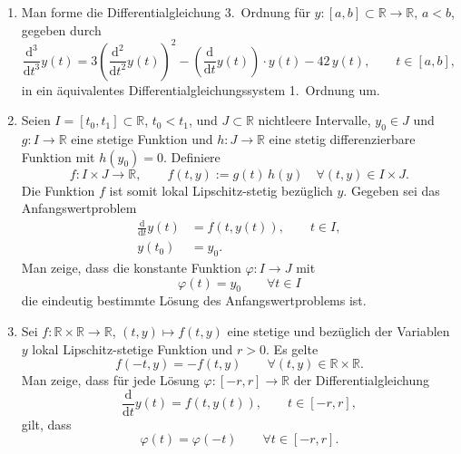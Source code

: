 \begin{enumerate}%
\item Man forme die Differentialgleichung 3.\ Ordnung für \(y:[a,b]\subset\mathbb{R}\to\mathbb{R}\), \(a<b\), gegeben durch
\[
\frac{\mathrm{d}^3}{\mathrm{d}t^3}y(t)=3\left(\frac{\mathrm{d}^2}{\mathrm{d}t^2}y(t)\right)^2-\left(\frac{\mathrm{d}}{\mathrm{d}t}y(t)\right)\cdot y(t)-42\,y(t),\qquad t\in[a,b],
\]
in ein äquivalentes Differentialgleichungssystem 1.\ Ordnung um.
\hfill {}
\vspace{1em}

\item Seien \(I=[t_0,t_1]\subset\mathbb{R}\), \(t_0<t_1\), und \(J\subset\mathbb{R}\) nichtleere Intervalle, \(y_0\in J\) und \(g:I\to\mathbb{R}\) eine stetige Funktion und \(h:J\to\mathbb{R}\) eine stetig differenzierbare Funktion mit \(h(y_0)=0\). Definiere
\[
f:I\times J\to\mathbb{R},\qquad f(t,y):=g(t)\,h(y)\quad\forall (t,y)\in I\times J.
\]
Die Funktion \(f\) ist somit lokal Lipschitz-stetig bezüglich \(y\). Gegeben sei das Anfangswertproblem
\begin{align*}
\frac{\mathrm{d}}{\mathrm{d}t}y(t)&=f(t,y(t)),\qquad t\in I,\\
y(t_0)&=y_0.
\end{align*}
Man zeige, dass die konstante Funktion \(\varphi:I\to J\) mit
\[
\varphi(t)=y_0\qquad\forall t\in I
\]
die eindeutig bestimmte Lösung des Anfangswertproblems ist.
\hfill {}
\vspace{1em}

\item Sei \(f:\mathbb{R}\times\mathbb{R}\to\mathbb{R}\), \((t,y)\mapsto f(t,y)\) eine stetige und bezüglich der Variablen \(y\) lokal Lipschitz-stetige Funktion und \(r>0\). Es gelte
\[
f(-t,y)=-f(t,y)\qquad\forall (t,y)\in\mathbb{R}\times\mathbb{R}.
\]
Man zeige, dass für jede Lösung \(\varphi:[-r,r]\to\mathbb{R}\) der Differentialgleichung
\[
\frac{\mathrm{d}}{\mathrm{d}t}y(t)=f(t,y(t)),\qquad t\in[-r,r],
\]
gilt, dass
\[
\varphi(t)=\varphi(-t)\qquad\forall t\in[-r,r].
\]
\hfill {}
\end{enumerate}